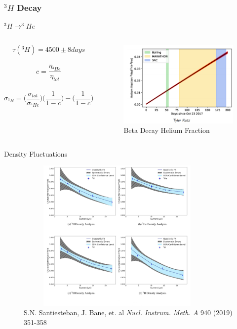\documentclass[12pt,usenames,dvipsnames]{beamer}
\begin{document}
\begin{frame}
\frametitle{$^3H $ Decay}
\begin{block}{$^3H \rightarrow ^3He$}
	\begin{columns}
		\begin{equation*}
		\tau(^3H) = 4500 \pm 8 days
		\end{equation*}		 	
		\\
		\begin{equation*}
		c = \frac{\eta_{^3He}} {\eta_{tot}}
		\end{equation*}
		\\
		\begin{equation*}
		\sigma_{^3H} = \big(\frac{\sigma_{tot}}{\sigma_{^3He}}\big) \big(\frac{1}{1-c}\big) -  \big(\frac{1}{1-c}\big)  
		\end{equation*}
		\begin{figure}
			\caption*{Beta Decay Helium Fraction}
			\includegraphics[width=6cm]{../images/beta_decay.png}
		\end{figure}
	\end{columns}
\end{block}
\end{frame}





\begin{frame}{Density Fluctuations}
	\vspace{-17pt}
	\begin{figure}
		\includegraphics[width=10cm,height=7.50cm]{../images/density_cor.pdf}
		\vspace{-0.5cm}
		\caption*{\footnotesize{S.N. Santiesteban, J. Bane, et. al \emph{Nucl. Instrum. Meth. A} 940 (2019) 351-358} }
	\end{figure}

\end{frame}
\end{document}
